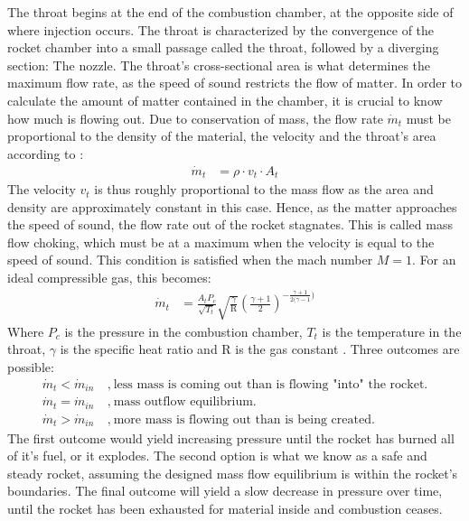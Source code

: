 	The throat begins at the end of the combustion chamber, at the opposite side of where injection occurs. The throat is characterized by the convergence of the rocket chamber into a small passage called the throat, followed by a diverging section: The nozzle. The throat's cross-sectional area is what determines the maximum flow rate, as the speed of sound restricts the flow of matter. In order to calculate the amount of matter contained in the chamber, it is crucial to know how much is flowing out. Due to conservation of mass, the flow rate $\dot{m}_t$ must be proportional to the density of the material, the velocity and the throat's area according to \cite{nasacompflow}:
		\begin{align}
			\dot{m}_t &= \rho \cdot v_t \cdot A_t
		\end{align}
		The velocity $v_t$ is thus roughly proportional to the mass flow as the area and density are approximately constant in this case. Hence, as the matter approaches the speed of sound, the flow rate out of the rocket stagnates. This is called mass flow choking, which must be at a maximum when the velocity is equal to the speed of sound. This condition is satisfied when the mach number $M=1$. For an ideal compressible gas, this becomes:
		\begin{align}
			\dot{m}_t &= \frac{A_t P_c}{\sqrt{T_t}} \sqrt{\frac{\gamma}{\text{R}}} \left(\frac{\gamma+1}{2}\right)^{-\frac{\gamma+1}{2(\gamma-1})}
		\end{align}
	Where $P_c$ is the pressure in the combustion chamber, $T_t$ is the temperature in the throat, $\gamma$ is the specific heat ratio and R is the gas constant \cite{nasacompflow}. Three outcomes are possible:
	\begin{align*}
		\dot{m}_t < \dot{m}_{in} & ~,~ \text{less mass is coming out than is flowing "into" the rocket.} \\
		\dot{m}_t = \dot{m}_{in} & ~,~ \text{mass outflow equilibrium.} \\
		\dot{m}_t > \dot{m}_{in} & ~,~ \text{more mass is flowing out than is being created.}
	\end{align*}
	The first outcome would yield increasing pressure until the rocket has burned all of it's fuel, or it explodes. The second option is what we know as a safe and steady rocket, assuming the designed mass flow equilibrium is within the rocket's boundaries. The final outcome will yield a slow decrease in pressure over time, until the rocket has been exhausted for material inside and combustion ceases. 


